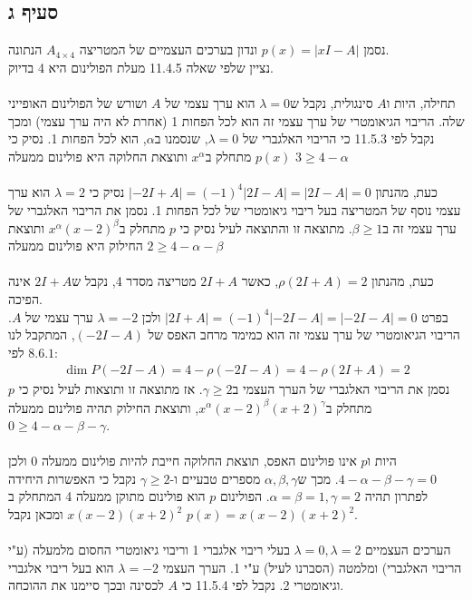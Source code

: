\documentclass{article}
\begin{document}
\subsection*{סעיף ג}

נסמן $p(x)=|xI-A|$ ונדון בערכים העצמיים של המטריצה $A_{4\times 4}$ הנתונה. \\
נציין שלפי שאלה 11.4.5 מעלת הפולינום היא 4 בדיוק.
\\\\
תחילה, היות ו$A$ סינגולית, נקבל ש$\lambda=0$ הוא ערך עצמי של $A$ ושורש של הפולינום האופייני שלה. הריבוי הגיאומטרי של ערך עצמי זה הוא לכל הפחות 1 (אחרת לא היה ערך עצמי) ומכך נקבל לפי 11.5.3 כי הריבוי האלגברי של $\lambda=0$, שנסמנו ב$\alpha$, הוא לכל הפחות 1.
נסיק כי $p(x)$ מתחלק ב$x^\alpha$ ותוצאת החלוקה היא פולינום ממעלה $3\geq 4-\alpha$
\\\\
כעת, מהנתון $|-2I+A|=(-1)^4|2I-A|=|2I-A|=0$ נסיק כי $\lambda=2$ הוא ערך עצמי נוסף של המטריצה בעל ריבוי גיאומטרי של לכל הפחות 1.
נסמן את הריבוי האלגברי של ערך עצמי זה ב$\beta \geq 1$. מתוצאה זו והתוצאה לעיל נסיק כי $p$ מתחלק ב$x^\alpha(x-2)^\beta$ ותוצאת החילוק היא פולינום ממעלה $2\geq 4-\alpha-\beta$
\\\\
כעת, מהנתון $\rho(2I+A)=2$, כאשר $2I+A$ מטריצה מסדר 4, נקבל ש$2I+A$ אינה הפיכה. \\
בפרט $|2I+A|=(-1)^4|-2I-A|=|-2I-A|=0$ ולכן $\lambda=-2$ ערך עצמי של $A$. הריבוי הגיאומטרי של ערך עצמי זה הוא כמימד מרחב האפס של $(-2I-A)$, המתקבל לנו לפי $8.6.1$:
\begin{align*}
    \dim P(-2I-A)=4-\rho(-2I-A)=4-\rho(2I+A)=2
\end{align*}
נסמן את הריבוי האלגברי של הערך העצמי ב$\gamma\geq 2$. אז מתוצאה זו ותוצאות לעיל נסיק כי $p$ מתחלק ב$x^\alpha(x-2)^\beta(x+2)^\gamma$, ותוצאת החילוק תהיה פולינום ממעלה $0\geq 4-\alpha-\beta-\gamma$.
\\\\
היות ו$p$ אינו פולינום האפס, תוצאת החלוקה חייבת להיות פולינום ממעלה 0 ולכן $4-\alpha-\beta-\gamma=0$. מכך ש$\alpha,\beta, \gamma$ מספרים טבעיים ו-$\gamma\geq 2$ נקבל כי האפשרות היחידה לפתרון תהיה $\alpha=\beta=1, \gamma=2$. הפולינום $p$ הוא פולינום מתוקן ממעלה 4 המתחלק ב$x(x-2)(x+2)^2$ ומכאן נקבל $p(x)=x(x-2)(x+2)^2$.
\\\\
הערכים העצמיים $\lambda=0, \lambda=2$ בעלי ריבוי אלגברי 1 וריבוי גיאומטרי החסום מלמעלה (ע"י הריבוי האלגברי) ומלמטה (הסברנו לעיל) ע"י 1. הערך העצמי $\lambda=-2$ הוא בעל ריבוי אלגברי וגיאומטרי 2. נקבל לפי 11.5.4 כי $A$ לכסינה ובכך סיימנו את ההוכחה.
\pagebreak
\end{document}
